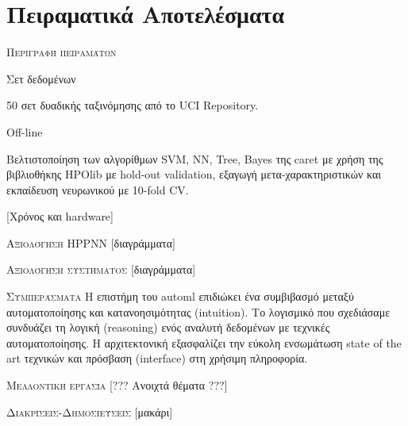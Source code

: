 \documentclass{beamer}
\begin{document}
   \section{Πειραματικά Αποτελέσματα}
  \begin{frame}{ \scshape Περιγραφή πειραμάτων}
  	\begin{minipage}[t]{.3\textwidth}  		
  		Σετ δεδομένων
  		\vspace{4ex}
  	\end{minipage}%
  	\begin{minipage}[t]{.6\textwidth}
  		50 σετ δυαδικής ταξινόμησης από το UCI Repository.
  		  	
  		\vspace{4ex}
  	\end{minipage}
  	\begin{minipage}[t]{.3\textwidth}  		
  		Off-line
  		\vspace{4ex}
  	\end{minipage}%
  	\begin{minipage}[t]{.6\textwidth}
  		Βελτιστοποίηση των αλγορίθμων SVM, NN, Tree, Bayes της caret με χρήση της βιβλιοθήκης HPOlib με hold-out validation, εξαγωγή μετα-χαρακτηριστικών και εκπαίδευση νευρωνικού με 10-fold CV.
  		
  		
  		[Χρόνος και hardware]
  		\vspace{4ex} 
  	\end{minipage} 
  \end{frame}
  \begin{frame}{ \scshape Αξιολόγηση HPPNN} 
  	[διαγράμματα]
  \end{frame}
  \begin{frame}{ \scshape Αξιολόγηση συστήματος} 
  	[διαγράμματα]
  \end{frame}
  \begin{frame}{ \scshape Συμπεράσματα} 
  	Η επιστήμη του automl επιδιώκει ένα συμβιβασμό μεταξύ αυτοματοποίησης και κατανοησιμότητας (intuition). Το λογισμικό που σχεδιάσαμε συνδυάζει τη λογική (reasoning) ενός αναλυτή δεδομένων με τεχνικές αυτοματοποίησης. Η αρχιτεκτονική εξασφαλίζει την εύκολη ενσωμάτωση state of the art τεχνικών και πρόσβαση (interface) στη χρήσιμη πληροφορία.
  \end{frame}
  \begin{frame}{ \scshape Μελλοντική εργασία} 
  	[??? Ανοιχτά θέματα ???]
  \end{frame}
  \begin{frame}{ \scshape Διακρίσεις-Δημοσιεύσεις} 
  	[μακάρι]
  \end{frame}
  
\end{document}
